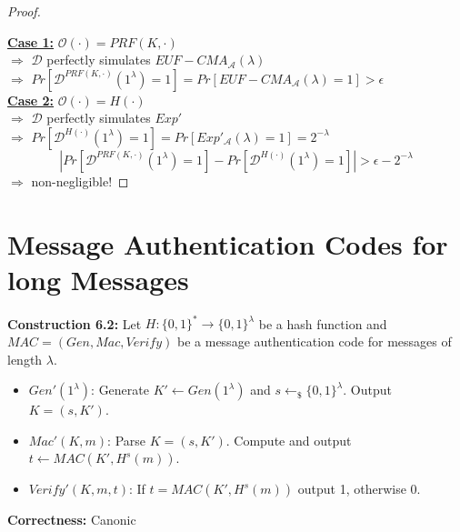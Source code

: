 \begin{proof}
\begin{center}
			\end{center}
			\underline{\textbf{Case 1:}} $\mathcal{O}(\cdot) = PRF(K,\cdot)$\\
			$\Rightarrow$ $\mathcal{D}$ perfectly simulates $EUF-CMA_{\mathcal{A}}(\lambda)$\\
			$\Rightarrow$ $Pr[\mathcal{D}^{PRF(K,\cdot)}(1^{\lambda}) = 1] = Pr[EUF-CMA_{\mathcal{A}}(\lambda) = 1] > \epsilon$\\
			\underline{\textbf{Case 2:}} $\mathcal{O}(\cdot) = H(\cdot)$\\
			$\Rightarrow$ $\mathcal{D}$ perfectly simulates $Exp'$\\
			$\Rightarrow$ $Pr[\mathcal{D}^{H(\cdot)}(1^{\lambda}) = 1] = Pr[Exp'_{\mathcal{A}}(\lambda) = 1] = 2^{-\lambda}$
			$$|Pr[\mathcal{D}^{PRF(K,\cdot)}(1^{\lambda}) = 1] - Pr[\mathcal{D}^{H(\cdot)}(1^{\lambda}) = 1]| > \epsilon - 2^{-\lambda}$$
			$\Rightarrow$ non-negligible!
		\end{proof}

\section{Message Authentication Codes for long Messages}
	\textbf{Construction 6.2:}
	Let $H: \{0,1\}^* \rightarrow \{0,1\}^{\lambda}$ be a hash function and $MAC = (Gen,Mac,Verify)$ be a message authentication code for messages of length $\lambda$.
	\begin{itemize}
		\item $Gen'(1^{\lambda})$: Generate $K' \leftarrow Gen(1^{\lambda})$ and $s \leftarrow_{\$} \{0,1\}^{\lambda}$. 
		Output $K = (s,K')$.
		\item $Mac'(K,m)$: Parse $K = (s,K')$.
		Compute and output $t \leftarrow MAC(K',H^s(m))$.
		\item $Verify'(K,m,t)$: If $t = MAC(K',H^s(m))$ output 1, otherwise 0.
	\end{itemize}
	\textbf{Correctness:} Canonic
	
